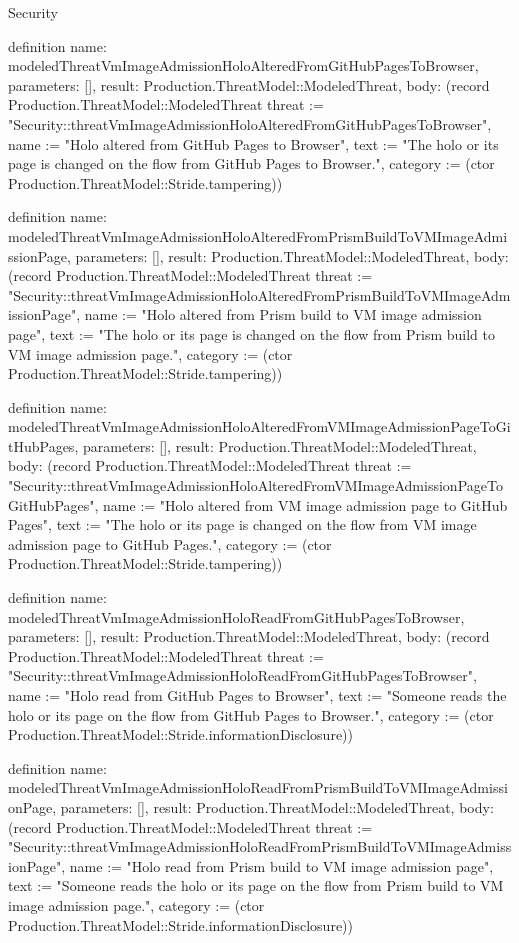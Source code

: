 \begin{lexlean}{Security}
\begin{semanticmodule}
definition{
  name: modeledThreatVmImageAdmissionHoloAlteredFromGitHubPagesToBrowser,
  parameters: [],
  result: Production.ThreatModel::ModeledThreat,
  body: (record Production.ThreatModel::ModeledThreat {threat := "Security::threatVmImageAdmissionHoloAlteredFromGitHubPagesToBrowser", name := "Holo altered from GitHub Pages to Browser", text := "The holo or its page is changed on the flow from GitHub Pages to Browser.", category := (ctor Production.ThreatModel::Stride.tampering)})
}

definition{
  name: modeledThreatVmImageAdmissionHoloAlteredFromPrismBuildToVMImageAdmissionPage,
  parameters: [],
  result: Production.ThreatModel::ModeledThreat,
  body: (record Production.ThreatModel::ModeledThreat {threat := "Security::threatVmImageAdmissionHoloAlteredFromPrismBuildToVMImageAdmissionPage", name := "Holo altered from Prism build to VM image admission page", text := "The holo or its page is changed on the flow from Prism build to VM image admission page.", category := (ctor Production.ThreatModel::Stride.tampering)})
}

definition{
  name: modeledThreatVmImageAdmissionHoloAlteredFromVMImageAdmissionPageToGitHubPages,
  parameters: [],
  result: Production.ThreatModel::ModeledThreat,
  body: (record Production.ThreatModel::ModeledThreat {threat := "Security::threatVmImageAdmissionHoloAlteredFromVMImageAdmissionPageToGitHubPages", name := "Holo altered from VM image admission page to GitHub Pages", text := "The holo or its page is changed on the flow from VM image admission page to GitHub Pages.", category := (ctor Production.ThreatModel::Stride.tampering)})
}

definition{
  name: modeledThreatVmImageAdmissionHoloReadFromGitHubPagesToBrowser,
  parameters: [],
  result: Production.ThreatModel::ModeledThreat,
  body: (record Production.ThreatModel::ModeledThreat {threat := "Security::threatVmImageAdmissionHoloReadFromGitHubPagesToBrowser", name := "Holo read from GitHub Pages to Browser", text := "Someone reads the holo or its page on the flow from GitHub Pages to Browser.", category := (ctor Production.ThreatModel::Stride.informationDisclosure)})
}

definition{
  name: modeledThreatVmImageAdmissionHoloReadFromPrismBuildToVMImageAdmissionPage,
  parameters: [],
  result: Production.ThreatModel::ModeledThreat,
  body: (record Production.ThreatModel::ModeledThreat {threat := "Security::threatVmImageAdmissionHoloReadFromPrismBuildToVMImageAdmissionPage", name := "Holo read from Prism build to VM image admission page", text := "Someone reads the holo or its page on the flow from Prism build to VM image admission page.", category := (ctor Production.ThreatModel::Stride.informationDisclosure)})
}


\end{semanticmodule}
\end{lexlean}
